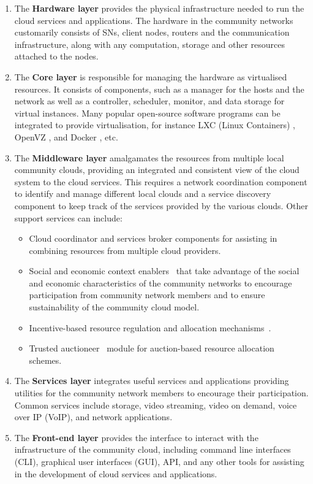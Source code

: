 \begin{enumerate}
	
	\item The \textbf{Hardware layer} provides the physical infrastructure needed to run the cloud services and applications. The hardware in the community networks customarily consists of SNs, client nodes, routers and the communication infrastructure, along with any computation, storage and other resources attached to the nodes.
	
	\item The \textbf{Core layer} is responsible for managing the hardware as virtualised resources. 
	It consists of components, such as a manager for the hosts and the network as well as a controller, scheduler, monitor, and data storage for virtual instances. 
	Many popular open-source software programs can be integrated to provide virtualisation, for instance LXC (Linux Containers) \cite{LXC}, OpenVZ \cite{OpenVZ}, and Docker \cite{Docker}, etc.

	\item The \textbf{Middleware layer} amalgamates the resources from multiple local community clouds, providing an integrated and consistent view of the cloud system to the cloud services. This requires a network coordination component to identify and manage different local clouds and a service discovery component to keep track of the services provided by the various clouds. Other support services can include:
	
	\begin{itemize}	
	\item Cloud coordinator and services broker components for assisting in combining resources from multiple cloud providers.
	\item Social and economic context enablers~\cite{Khan2014Architecture} that take advantage of the social and economic characteristics of the community networks to encourage participation from community network members and to ensure sustainability of the community cloud model.
	\item Incentive-based resource regulation and allocation mechanisms~\cite{Khan2015Incentive}.
	\item Trusted auctioneer~\cite{Khan2016Distributed} module for auction-based resource allocation schemes.
	\end{itemize}	 
	
	\item The \textbf{Services layer} integrates useful services and applications providing utilities for the community network members to encourage their participation. Common services include storage, video streaming, video on demand, voice over IP (VoIP), and network applications.
	
	\item The \textbf{Front-end layer} provides the interface to interact with the infrastructure of the community cloud, including command line interfaces (CLI), graphical user interfaces (GUI), 
API, and any other tools for assisting in the development of cloud services and applications.
	 
\end{enumerate}

